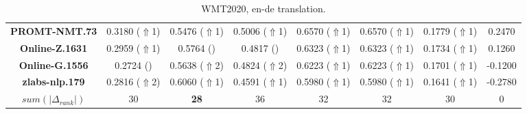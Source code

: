 \begin{table*}[ht]
\begin{tabular}{cccccccc}
\textbf{PROMT-NMT.73} & {0.3180 ($\Uparrow$1)} & {0.5476 ($\Uparrow$1)} & {0.5006 ($\Uparrow$1)} & {0.6570 ($\Uparrow$1)} & {0.6570 ($\Uparrow$1)} & {0.1779 ($\Uparrow$1)} & {0.2470} \\
\textbf{Online-Z.1631} & {0.2959 ($\Uparrow$1)} & {0.5764 (\checkmark0)} & {0.4817 (\checkmark0)} & {0.6323 ($\Uparrow$1)} & {0.6323 ($\Uparrow$1)} & {0.1734 ($\Uparrow$1)} & {0.1260} \\
\textbf{Online-G.1556} & {0.2724 (\checkmark0)} & {0.5638 ($\Uparrow$2)} & {0.4824 ($\Uparrow$2)} & {0.6223 ($\Uparrow$1)} & {0.6223 ($\Uparrow$1)} & {0.1701 ($\Uparrow$1)} & {-0.1200} \\
\textbf{zlabs-nlp.179} & {0.2816 ($\Uparrow$2)} & {0.6060 ($\Uparrow$1)} & {0.4591 ($\Uparrow$1)} & {0.5980 ($\Uparrow$1)} & {0.5980 ($\Uparrow$1)} & {0.1641 ($\Uparrow$1)} & {-0.2780} \\
\midrule
$sum(|\Delta_{rank}|)$ & {30} & \textbf{28} & {36} & {32} & {32} & {30} & {0} \\
\bottomrule
\end{tabular}
\caption{\label{tab:wmt_2020_en-de}WMT2020, en-de translation.}
\end{table*}
